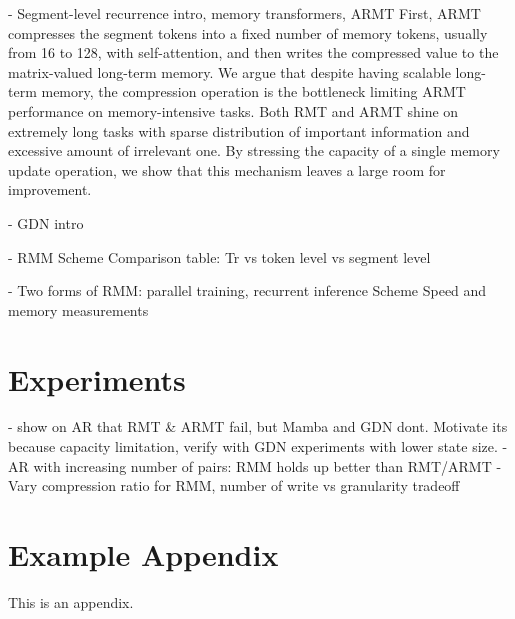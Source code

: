 \documentclass[11pt]{article}
\begin{document}
- Segment-level recurrence intro, memory transformers, ARMT
First, ARMT compresses the segment tokens into a fixed number of memory tokens, usually from 16 to 128, with self-attention, and then writes the compressed value to the matrix-valued long-term memory. 
We argue that despite having scalable long-term memory, the compression operation is the bottleneck limiting ARMT performance on memory-intensive tasks. Both RMT and ARMT shine on extremely long tasks with sparse distribution of important information and excessive amount of irrelevant one. By stressing the capacity of a single memory update operation, we show that this mechanism leaves a large room for improvement. 

- GDN intro

- RMM
    Scheme
    Comparison table: Tr vs token level vs segment level

- Two forms of RMM: parallel training, recurrent inference
    Scheme
    Speed and memory measurements


\section{Experiments}

- show on AR that RMT \& ARMT fail, but Mamba and GDN dont. Motivate its because capacity limitation, verify with GDN experiments with lower state size.
- AR with increasing number of pairs: RMM holds up better than RMT/ARMT
- Vary compression ratio for RMM, number of write vs granularity tradeoff




%


\appendix

\section{Example Appendix}
\label{sec:appendix}

This is an appendix.
\end{document}
